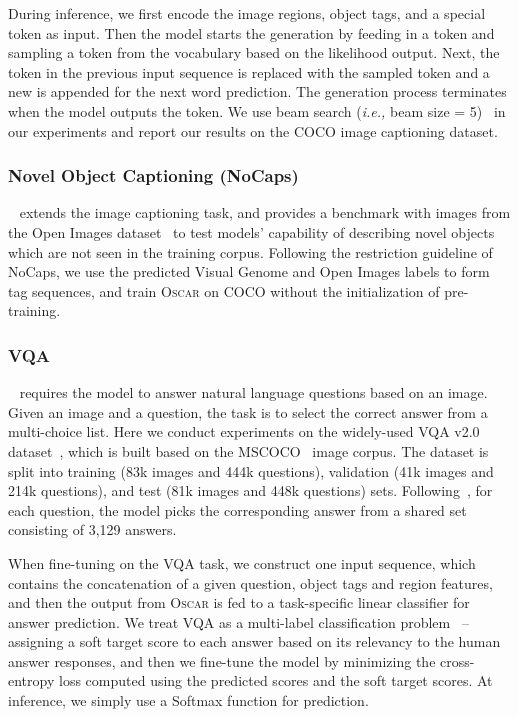 \documentclass[runningheads]{llncs}
\newcommand{\ie}[0]{\emph{i.e., }}
\newcommand{\short}{\textsc{Oscar}}
\def\secvspace{{\vspace{-4mm}}}
\begin{document}
During inference, we first encode the image regions, object tags, and a special token  as input. Then the model starts the generation by feeding in a  token and sampling a token from the vocabulary based on the likelihood output. Next, the  token in the previous input sequence is replaced with the sampled token and a new  is appended for the next word prediction. The generation process terminates when the model outputs the  token. We use beam search (\ie beam size = 5)~\cite{anderson2018bottom} in our experiments and report our results on the COCO image captioning dataset. 


\secvspace
\subsubsection{Novel Object Captioning (NoCaps)} ~\cite{agrawal2019nocaps} extends the image captioning task, and provides a benchmark with images from the Open Images dataset~\cite{kuznetsova2018open} to test models' capability of describing novel objects which are not seen in the training corpus. Following the restriction guideline of NoCaps, we use the predicted Visual Genome and Open Images labels to form tag sequences, and train \short{} on COCO without the initialization of pre-training. 

\secvspace
\subsubsection{VQA}\label{sec:vqa}~\cite{goyal2017making} requires the model to answer natural language questions based on an image. Given an image and a question, the task is to select the correct answer from a multi-choice list. Here we conduct experiments on the widely-used VQA v2.0 dataset~\cite{goyal2017making}, which is built based on the MSCOCO~\cite{lin2014microsoft} image corpus. The dataset is split into training (83k images and 444k questions), validation (41k images and 214k questions), and test (81k images and 448k questions) sets. Following~\cite{anderson2018bottom}, for each question, the model picks the corresponding answer from a shared set consisting of 3,129 answers.

When fine-tuning on the VQA task, we construct one input sequence, which contains the concatenation of a given question, object tags and region features, and then the  output from \short{} is fed to a task-specific linear classifier for answer prediction.
We treat VQA as a multi-label classification problem~\cite{anderson2018bottom} – assigning a soft target score to each answer based on its relevancy to the human answer responses, and then we fine-tune the model by minimizing the cross-entropy loss computed using the predicted scores and the soft target scores. At inference, we simply use a Softmax function for prediction.
\end{document}
